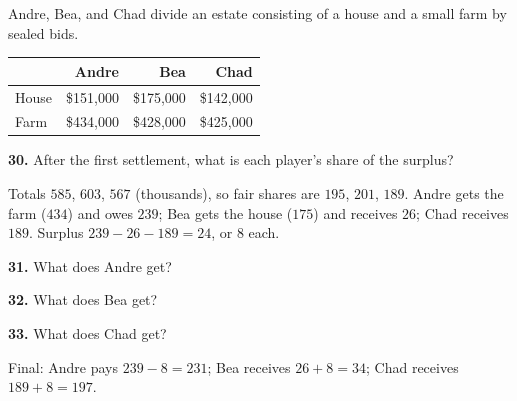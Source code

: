 \documentclass[12pt]{ximera}
\begin{document}
\begin{problem}
Andre, Bea, and Chad divide an estate consisting of a house and a small farm by sealed
bids.
\begin{center}
\begin{tabular}{l|rrr}
 & Andre & Bea & Chad\\\hline
House & \$151,000 & \$175,000 & \$142,000\\
Farm & \$434,000 & \$428,000 & \$425,000
\end{tabular}
\end{center}

\begin{prompt}
\textbf{30.} After the first settlement, what is each player's share of the surplus?
\begin{multipleChoice}
\end{multipleChoice}
\begin{feedback}
Totals $585$, $603$, $567$ (thousands), so fair shares are $195$, $201$, $189$. Andre gets the farm ($434$) and owes $239$; Bea gets the house ($175$) and receives $26$; Chad receives $189$. Surplus $239-26-189=24$, or $8$ each.
\end{feedback}
\end{prompt}

\begin{prompt}
\textbf{31.} What does Andre get?
\begin{multipleChoice}
\end{multipleChoice}
\end{prompt}

\begin{prompt}
\textbf{32.} What does Bea get?
\begin{multipleChoice}
\end{multipleChoice}
\end{prompt}

\begin{prompt}
\textbf{33.} What does Chad get?
\begin{multipleChoice}
\end{multipleChoice}
\begin{feedback}
Final: Andre pays $239-8=231$; Bea receives $26+8=34$; Chad receives $189+8=197$.
\end{feedback}
\end{prompt}
\end{problem}
\end{document}
